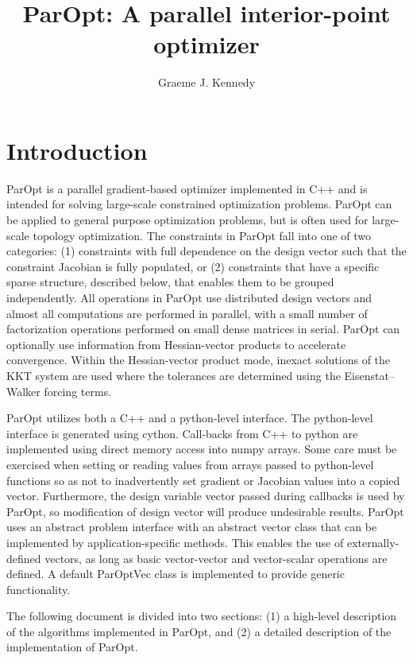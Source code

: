 \documentclass[12pt]{article}
\title{ParOpt: A parallel interior-point optimizer}
\author{Graeme J. Kennedy}
\date{}
\begin{document}
\maketitle

\section{Introduction}

ParOpt is a parallel gradient-based optimizer implemented in C++ and is intended for solving large-scale constrained optimization problems.
ParOpt can be applied to general purpose optimization problems, but is often used for large-scale topology optimization. 
The constraints in ParOpt fall into one of two categories: (1) constraints with full dependence on the design vector such that the constraint Jacobian is fully populated, or (2) constraints that have a specific sparse structure, described below, that enables them to be grouped independently.
All operations in ParOpt use distributed design vectors and almost all computations are performed in parallel, with a small number of factorization operations performed on small dense matrices in serial.
ParOpt can optionally use information from Hessian-vector products to accelerate convergence.
Within the Hessian-vector product mode, inexact solutions of the KKT system are used where the tolerances are determined using the Eisenstat--Walker forcing terms.

ParOpt utilizes both a C++ and a python-level interface.
The python-level interface is generated using cython.
Call-backs from C++ to python are implemented using direct memory access into numpy arrays.
Some care must be exercised when setting or reading values from arrays passed to python-level functions so as not to inadvertently set gradient or Jacobian values into a copied vector.
Furthermore, the design variable vector passed during callbacks is used by ParOpt, so modification of design vector will produce undesirable results.
ParOpt uses an abstract problem interface with an abstract vector class that can be implemented by application-specific methods.
This enables the use of externally-defined vectors, as long as basic vector-vector and vector-scalar operations are defined.
A default ParOptVec class is implemented to provide generic functionality.

The following document is divided into two sections: (1) a high-level description of the algorithms implemented in ParOpt, and (2) a detailed description of the implementation of ParOpt.
\end{document}
